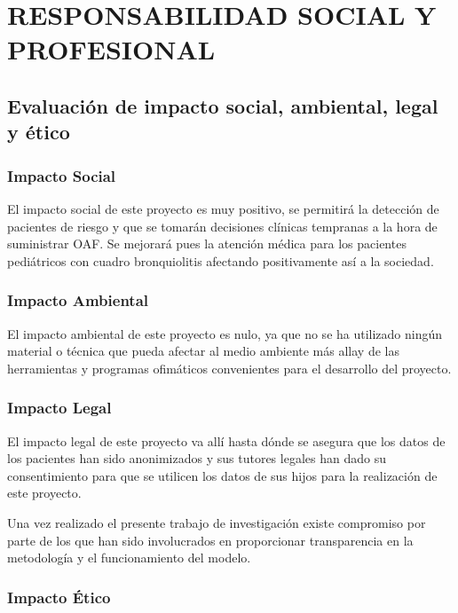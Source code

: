 \section{RESPONSABILIDAD SOCIAL Y PROFESIONAL}\label{cap:responsabilidadSocialYProfesional}

\subsection{Evaluación de impacto social, ambiental, legal y ético}

\subsubsection{Impacto Social}

El impacto social de este proyecto es muy positivo, se permitirá la detección de pacientes de riesgo y que se tomarán decisiones clínicas tempranas a la hora de suministrar OAF. Se mejorará pues la atención médica para los pacientes pediátricos con cuadro bronquiolitis afectando positivamente así a la sociedad. 

\subsubsection{Impacto Ambiental}

El impacto ambiental de este proyecto es nulo, ya que no se ha utilizado ningún material o técnica que pueda afectar al medio ambiente más allay de las herramientas y programas ofimáticos convenientes para el desarrollo del proyecto.

\subsubsection{Impacto Legal}

El impacto legal de este proyecto va allí hasta dónde se asegura que los datos de los pacientes han sido anonimizados y sus tutores legales han dado su consentimiento para que se utilicen los datos de sus hijos para la realización de este proyecto.

Una vez realizado el presente trabajo de investigación existe compromiso por parte de los que han sido involucrados en proporcionar transparencia en la metodología y el funcionamiento del modelo. 

\subsubsection{Impacto Ético}

